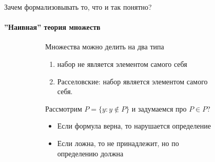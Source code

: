 \begin{frame}{Зачем формализовывать то, что и так понятно?}
\framesubtitle{''Наивная'' теория множеств}
\begin{figure}[t]
  \begin{subfigure}[t]{0.55\textwidth}
    \vspace{-7em}
  Множества можно делить на два типа
  \begin{enumerate}
    \item   набор не является элементом самого себя
    \item Расселовские: набор является элементом самого себя.
  \end{enumerate}
  Рассмотрим $P=\{y: y\notin P\}$ и задумаемся про $P\in P$?
  \begin{itemize}
    \item Если формула верна, то нарушается определение
    \item Если ложна, то не принадлежит, но по определению должна
  \end{itemize}


\end{subfigure}
\end{figure}
\end{frame}
